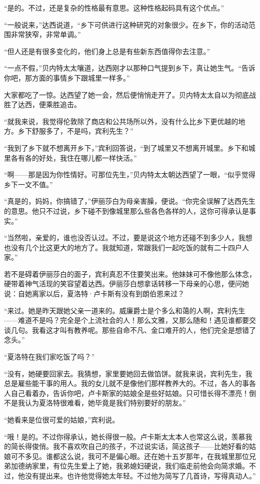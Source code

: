 \par “是的。不过，还是复杂的性格最有意思。这种性格起码具有这个优点。”
\par “一般说来，”达西说道，“乡下可供进行这种研究的对象很少。在乡下，你的活动范围非常狭窄，非常单调。”
\par “但人还是有很多变化的，他们身上总是有些新东西值得你去注意。”
\par “一点不假，”贝内特太太嚷道，达西刚才以那种口气提到乡下，真让她生气。“告诉你吧，那方面的事情乡下跟城里一样多。”
\par 大家都吃了一惊。达西望了她一会，然后便悄悄走开了。贝内特太太自以为彻底战胜了达西，便乘胜追击。
\par “就我来说，我觉得伦敦除了商店和公共场所以外，没有什么比乡下更优越的地方。乡下舒服多了，不是吗，宾利先生？”
\par “我到了乡下就不想离开乡下，”宾利回答说，“到了城里又不想离开城里。乡下和城里各有各的好处，我住在哪儿都一样快活。”
\par “啊——那是因为你性情好。可那位先生，”贝内特太太朝达西望了一眼，“似乎觉得乡下一文不值。”
\par “真是的，妈妈，你搞错了，”伊丽莎白为母亲害臊，便说。“你完全误解了达西先生的意思。他只不过说，乡下碰不到像城里那么些各色各样的人，这你可得承认是事实。”
\par “当然啦，亲爱的，谁也没否认过。不过，要是说这个地方还碰不到多少人，我想也没有几个比这更大的地方了。我就知道，常跟我们一起吃饭的就有二十四户人家。”
\par 若不是碍着伊丽莎白的面子，宾利真忍不住要笑出来。他妹妹可不像他那么体念，硬带着神气活现的笑容望着达西。伊丽莎白想拿话转移一下母亲的心思，便问她说：自她离家以后，夏洛特·卢卡斯有没有到朗伯恩来过？
\par “来过。她是昨天跟她父亲一道来的。威廉爵士是个多么和蔼的人啊，宾利先生——难道不是吗？完全是个上流社会的人！那么文雅，又那么随和！遇见谁都要交谈几句。我看这才叫有教养呢。那些自命不凡、金口难开的人，他们完全是想错了念头。”
\par “夏洛特在我们家吃饭了吗？”
\par “没有，她硬要回家去。我猜想，家里要她回去做馅饼。就我来说，宾利先生，我总是雇些能干事的用人。我的女儿就不是像他们那样教养大的。不过，各人的事各人自己看着办，告诉你吧，卢卡斯家的姑娘全是些好姑娘。只可惜长得不漂亮！倒不是我认为夏洛特很难看，她毕竟是我们特别要好的朋友。”
\par “她看来是位很可爱的姑娘，”宾利说。
\par “哦！是的。不过你得承认，她长得很一般。卢卡斯太太本人也常这么说，羡慕我的简长得俊俏。我不喜欢吹自己的孩子，不过说实话，简这孩子——比她好看的姑娘可不多见。谁都这么说，我可不是偏心眼。还在她十五岁那年，在我城里那位兄弟加德纳家里，有位先生爱上了她，我弟媳妇硬说，我们临走前他会向简求婚。不过，他没有提出来。也许他觉得她太年轻。不过他为简写了几首诗，写得真动人。”
